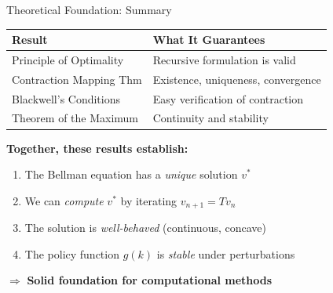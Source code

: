 \begin{frame}{Theoretical Foundation: Summary}
\begin{center}
\begin{tabular}{l l}
\toprule
\textbf{Result} & \textbf{What It Guarantees} \\
\midrule
Principle of Optimality & Recursive formulation is valid \\
Contraction Mapping Thm & Existence, uniqueness, convergence \\
Blackwell's Conditions & Easy verification of contraction \\
Theorem of the Maximum & Continuity and stability \\
\bottomrule
\end{tabular}
\end{center}

\bigskip
\textbf{Together, these results establish:}
\begin{enumerate}
    \item The Bellman equation has a \emph{unique} solution $v^*$
    \item We can \emph{compute} $v^*$ by iterating $v_{n+1} = Tv_n$
    \item The solution is \emph{well-behaved} (continuous, concave)
    \item The policy function $g(k)$ is \emph{stable} under perturbations
\end{enumerate}

\bigskip
$\Rightarrow$ \textbf{Solid foundation for computational methods}
\end{frame}



